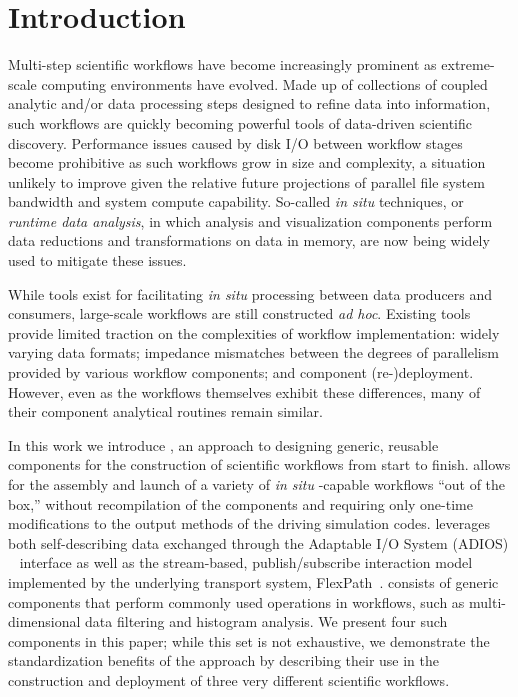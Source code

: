 
\newcommand{\insitu}{\textit{in situ }}
\section{Introduction}
\label{s:intro}

Multi-step scientific workflows have become increasingly prominent as
extreme-scale computing environments have evolved. Made up of collections of
coupled analytic and/or data processing steps designed to refine data into
information, such workflows are quickly becoming powerful tools of data-driven
scientific discovery.
Performance issues caused by disk I/O between
workflow stages become prohibitive
as such workflows grow in size and complexity,
a situation unlikely to improve
given the relative future projections of parallel
file system bandwidth and system
compute capability. So-called \textit{in situ}
techniques, or \textit{runtime data analysis},
in which analysis and visualization
components perform data reductions and transformations
on data in memory, are now being widely used to mitigate these issues. 

While tools exist for facilitating \insitu processing
between data producers and consumers, large-scale workflows
are still constructed  \textit{ad hoc}. Existing
tools provide limited traction on the complexities of
workflow implementation:
widely varying data formats; impedance mismatches
between the degrees of parallelism provided by various workflow
components; and component (re-)deployment.
However, even as the workflows themselves exhibit
these differences, many of their component
analytical routines remain similar.

In this work we introduce \sys, an approach to designing generic, reusable components
for the construction of scientific workflows from start to finish.
\sys allows for the assembly and launch
of a variety of \insitu -capable workflows ``out of
the box,'' without recompilation of the components and requiring only one-time modifications to the
output methods of the driving simulation codes. \sys leverages both self-describing data exchanged
through the Adaptable I/O System (ADIOS) ~\cite{lofstead:2009:adaptable} interface as well as the stream-based,
publish/subscribe interaction model implemented by the underlying transport system,
FlexPath~\cite{dayal:2014:flexpath}. \sys consists of generic components that perform commonly used
operations in workflows, such as multi-dimensional data filtering and histogram analysis. We present four
such components in this paper; while this set is not exhaustive, we demonstrate the standardization
benefits of the \sys approach by describing their use in the construction and deployment of three very
different scientific workflows.

